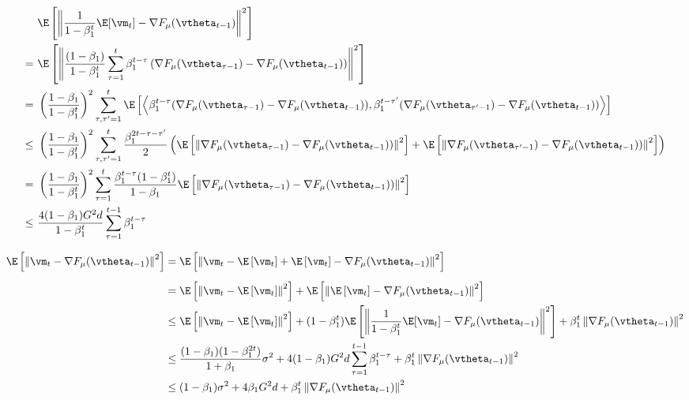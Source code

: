 \begin{equation}
\begin{aligned}
\ &\E\left[\left\|\frac{1}{1 - \beta_1^t}\E[\vm_t] - \nabla F_{\mu}(\vtheta_{t-1})\right\|^2\right] \\
=\ & \E\left[\left\|\frac{(1 - \beta_1)}{1 - \beta_1^t} \sum_{\tau=1}^t \beta_1^{t-\tau}\left(\nabla F_{\mu}(\vtheta_{\tau-1}) - \nabla F_{\mu}(\vtheta_{t-1})\right)\right\|^2\right] \\
=\ &\left(\frac{1-\beta_1}{1-\beta_1^t}\right)^2\sum_{\tau,\tau'=1}^t\E\left[\Big\langle \beta_1^{t-\tau}(\nabla F_{\mu}(\vtheta_{\tau-1}) - \nabla F_{\mu}(\vtheta_{t-1})), \beta_1^{t-\tau'}(\nabla F_{\mu}(\vtheta_{\tau'-1}) - \nabla F_{\mu}(\vtheta_{t-1}))\Big\rangle\right] \\
\leq\ & \left(\frac{1-\beta_1}{1-\beta_1^t}\right)^2\sum_{\tau,\tau'=1}^t \frac{\beta_1^{2t-\tau-\tau'}}{2}\left(\E\left[\left\|\nabla F_{\mu}(\vtheta_{\tau-1}) - \nabla F_{\mu}(\vtheta_{t-1}))\right\|^2\right] + \E\left[\left\|\nabla F_{\mu}(\vtheta_{\tau'-1}) - \nabla F_{\mu}(\vtheta_{t-1}))\right\|^2\right]\right) \\
=\ & \left(\frac{1-\beta_1}{1-\beta_1^t}\right)^2\sum_{\tau=1}^t \frac{\beta_1^{t-\tau}(1 - \beta_1^t)}{1-\beta_1} \E\left[\left\|\nabla F_{\mu}(\vtheta_{\tau-1}) - \nabla F_{\mu}(\vtheta_{t-1}))\right\|^2\right] \\
\leq\ &\frac{4(1-\beta_1)G^2d}{1-\beta_1^{t}}\sum_{\tau=1}^{t-1} \beta_1^{t-\tau}
\end{aligned}
\end{equation}

\begin{equation}
\begin{aligned}
\E\left[\left\|\vm_t - \nabla F_{\mu}(\vtheta_{t-1})\right\|^2\right] &= \E\left[\left\|\vm_t - \E\left[\vm_t\right] + \E\left[\vm_t\right] - \nabla F_{\mu}(\vtheta_{t-1})\right\|^2\right] \\[5pt]
&= \E\left[\left\|\vm_t - \E\left[\vm_t\right]\right\|^2\right] + \E\left[\left\|\E\left[\vm_t\right] - \nabla F_{\mu}(\vtheta_{t-1})\right\|^2\right] \\
&\leq \E\left[\left\|\vm_t - \E\left[\vm_t\right]\right\|^2\right] + (1-\beta_1^t)\E\left[\left\|\frac{1}{1 - \beta_1^t}\E[\vm_t] - \nabla F_{\mu}(\vtheta_{t-1})\right\|^2\right] + \beta_1^{t}\left\|\nabla F_{\mu}(\vtheta_{t-1})\right\|^2 \\
&\leq \frac{(1-\beta_1)(1-\beta_1^{2t})}{1 + \beta_1} \sigma^2 + 4(1-\beta_1)G^2d\sum_{\tau=1}^{t-1} \beta_1^{t-\tau} + \beta_1^{t}\left\|\nabla F_{\mu}(\vtheta_{t-1})\right\|^2 \\
&\leq (1-\beta_1)\sigma^2 + 4\beta_1G^2d + \beta_1^t \left\|\nabla F_{\mu}(\vtheta_{t-1})\right\|^2
\end{aligned}
\end{equation}

